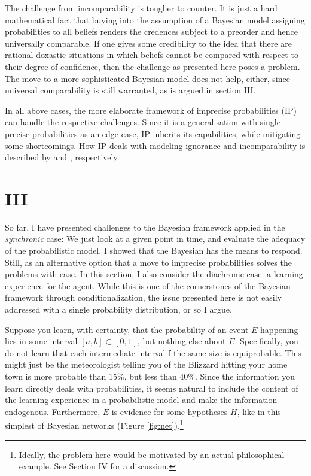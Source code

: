 \documentclass[11pt, a4paper]{scrartcl}
\begin{document}
The challenge from incomparability is tougher to counter. It is just a hard mathematical fact that buying into the assumption of a Bayesian model assigning probabilities to all beliefs renders the credences subject to a preorder and hence universally comparable. If one gives some credibility to the idea that there are rational doxastic situations in which beliefs cannot be compared with respect to their degree of confidence, then the challenge as presented here poses a problem. The move to a more sophisticated Bayesian model does not help, either, since universal comparability is still warranted, as is argued in section III.  

In all above cases, the more elaborate framework of imprecise probabilities (IP) can handle the respective challenges. Since it is a generalisation with single precise probabilities as an edge case, IP inherits its capabilities, while mitigating some shortcomings. How IP deals with modeling ignorance and incomparability is described by \citep{Elkin} and \citep{Norton2011-NORCTB}, respectively. 

\section{III}

So far, I have presented challenges to the Bayesian framework applied in the \emph{synchronic} case: We just look at a given point in time, and evaluate the adequacy of the probabilistic model. I showed that the Bayesian has the means to respond. Still, as an alternative option that a move to imprecise probabilities solves the problems with ease. In this section, I also consider the diachronic case: a learning experience for the agent. While this is one of the cornerstones of the Bayesian framework through conditionalization, the issue presented here is not easily addressed with a single probability distribution, or so I argue. 

Suppose you learn, with certainty, that the probability of an event $E$ happening lies in some interval $[a,b] \subset [0,1]$, but nothing else about $E$. Specifically, you do not learn that each intermediate interval f the same size is equiprobable. This might just be the meteorologist telling you of the Blizzard hitting your home town is more probable than 15\%, but less than 40\%. Since the information you learn directly deals with probabilities, it seems natural to include the content of the learning experience in a probabilistic model and make the information endogenous. Furthermore, $E$ is evidence for some hypotheses $H$, like in this simplest of Bayesian networks (Figure \ref{fig:net}).\footnote{Ideally, the problem here would be motivated by an actual philosophical example. See Section IV for a discussion.}
\end{document}
